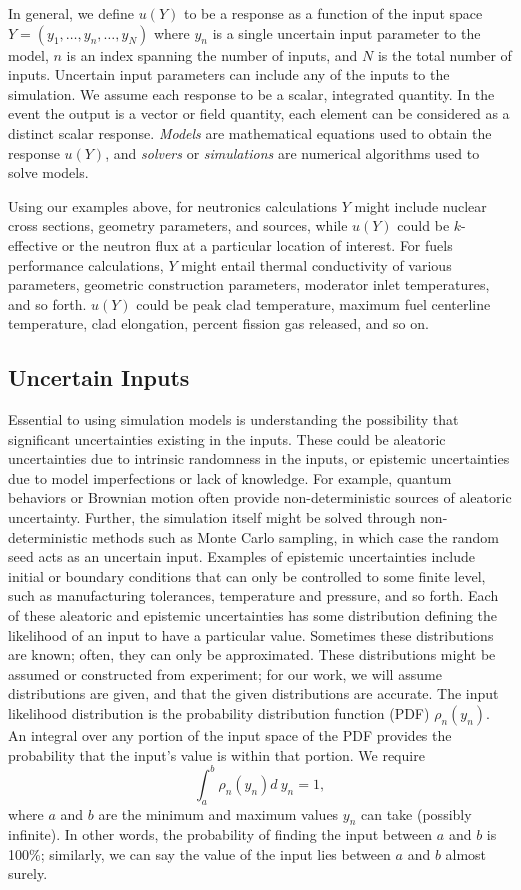In general, we define $u(Y)$ to be
a response as a function of the input space $Y = (y_1,\ldots,y_n,\ldots,y_N)$ where $y_n$ is a single
uncertain input
parameter to the model, $n$ is an index spanning the number of inputs, and $N$ is the total number of inputs.
Uncertain input parameters can include any of the inputs to the simulation.
We assume each response to be a scalar, integrated quantity.  In the event
the output is a vector or field quantity, each element can be considered as a distinct scalar response.
\emph{Models} are mathematical equations used to obtain the response $u(Y)$, and \emph{solvers} or
\emph{simulations} are numerical algorithms used to solve models.

Using our examples above, for neutronics calculations $Y$ might include nuclear cross sections, geometry
parameters, and sources, while $u(Y)$ could be $k$-effective or the neutron flux at a particular location of
interest.  For fuels performance calculations, $Y$ might entail thermal conductivity of various parameters,
geometric construction parameters, moderator inlet temperatures, and so forth.  $u(Y)$ could be peak clad
temperature, maximum fuel centerline temperature, clad elongation, percent fission gas released, and so on.

\subsection{Uncertain Inputs}
Essential to using simulation models is understanding the possibility that significant uncertainties existing in
the inputs.  These could be aleatoric uncertainties due to intrinsic randomness in the inputs, or epistemic
uncertainties due to model imperfections or lack of knowledge.  
For example, quantum behaviors or Brownian motion often provide non-deterministic sources of aleatoric uncertainty.
Further, the simulation itself might be solved through non-deterministic methods such as Monte Carlo sampling,
in which case the random seed acts as an uncertain input.  Examples of epistemic uncertainties include initial
or boundary conditions that can only be controlled to some finite level, such as manufacturing tolerances,
temperature and pressure, and so forth.
Each of these aleatoric and epistemic uncertainties has some
distribution defining the likelihood of an input to have a particular value.  Sometimes these distributions
are known; often, they can only be approximated.  These distributions might be
assumed or constructed from experiment; for our work, we will assume distributions are given, and that the given 
distributions are accurate.  The
input likelihood distribution is the probability distribution function (PDF) $\rho_n(y_n)$.  
An integral over any portion of the input space of the PDF provides the probability that the input's value
is within that portion.
We require
\begin{equation}
  \int_a^b \rho_n(y_n) d\ y_n = 1,
\end{equation}
where $a$ and $b$ are the minimum and maximum values $y_n$ can take (possibly infinite).  In other words, the
probability of finding the input between $a$ and $b$ is 100\%; similarly, we can say the value of the input
lies between $a$ and $b$ almost surely.

